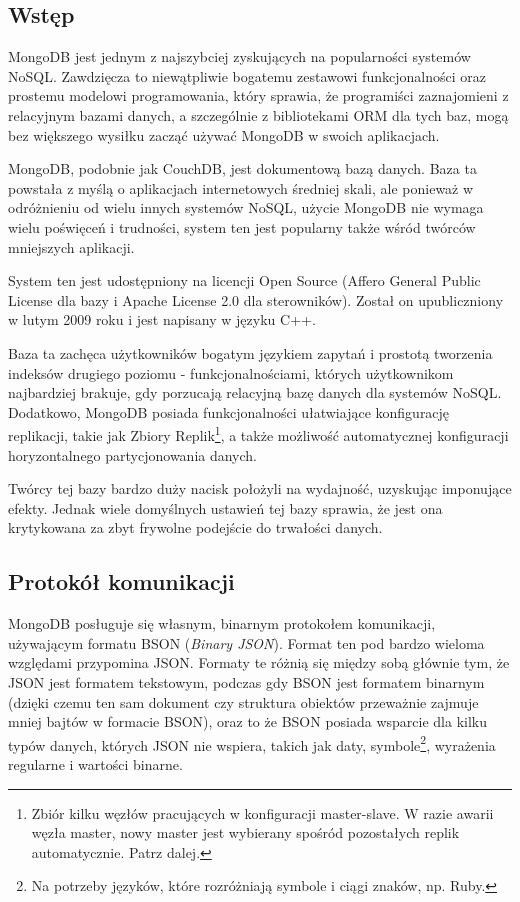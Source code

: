 \subsection*{Wstęp} 

MongoDB jest jednym z najszybciej zyskujących na popularności systemów NoSQL.
Zawdzięcza to niewątpliwie bogatemu zestawowi funkcjonalności oraz prostemu modelowi programowania, który sprawia, że programiści zaznajomieni z relacyjnym bazami danych, a szczególnie z bibliotekami ORM dla tych baz, mogą bez większego wysiłku zacząć używać MongoDB w swoich aplikacjach.

MongoDB, podobnie jak CouchDB, jest dokumentową bazą danych.
Baza ta powstała z myślą o aplikacjach internetowych średniej skali, ale ponieważ w odróżnieniu od wielu innych systemów NoSQL, użycie MongoDB nie wymaga wielu poświęceń i trudności, system ten jest popularny także wśród twórców mniejszych aplikacji.

System ten jest udostępniony na licencji Open Source (Affero General Public License dla bazy i Apache License 2.0 dla sterowników).
Został on upubliczniony w lutym 2009 roku i jest napisany w języku C++.

Baza ta zachęca użytkowników bogatym językiem zapytań i prostotą tworzenia indeksów drugiego poziomu - funkcjonalnościami, których użytkownikom najbardziej brakuje, gdy porzucają relacyjną bazę danych dla systemów NoSQL.
Dodatkowo, MongoDB posiada funkcjonalności ułatwiające konfigurację replikacji, takie jak Zbiory Replik\footnote{Zbiór kilku węzłów pracujących w konfiguracji master-slave. W razie awarii węzła master, nowy master jest wybierany spośród pozostałych replik automatycznie. Patrz dalej.}, a także możliwość automatycznej konfiguracji horyzontalnego partycjonowania danych.

Twórcy tej bazy bardzo duży nacisk położyli na wydajność, uzyskując imponujące efekty.
Jednak wiele domyślnych ustawień tej bazy sprawia, że jest ona krytykowana za zbyt frywolne podejście do trwałości danych.

\subsection*{Protokół komunikacji}

MongoDB posługuje się własnym, binarnym protokołem komunikacji, używającym formatu BSON (\emph{Binary JSON}).
Format ten pod bardzo wieloma względami przypomina JSON.
Formaty te różnią się między sobą głównie tym, że JSON jest formatem tekstowym, podczas gdy BSON jest formatem binarnym (dzięki czemu ten sam dokument czy struktura obiektów przeważnie zajmuje mniej bajtów w formacie BSON), oraz to że BSON posiada wsparcie dla kilku typów danych, których JSON nie wspiera, takich jak daty, symbole\footnote{Na potrzeby języków, które rozróżniają symbole i ciągi znaków, np. Ruby.}, wyrażenia regularne i wartości binarne.

